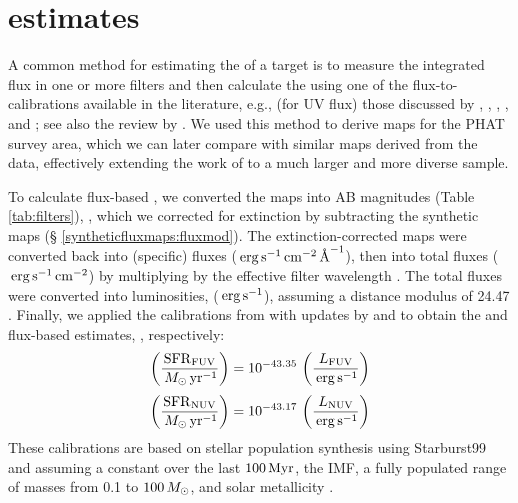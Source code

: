 \documentclass[iop, tighten]{emulateapj}
\begin{document}
\section{\sfr{} estimates}\label{sfrestimates}

\figsfrmapsone

\figsfrmapstwo

A common method for estimating the \sfr{} of a target is to measure the
integrated flux in one or more filters and then calculate the \sfr{} using one
of the flux-to-\sfr{} calibrations available in the literature, e.g., (for UV
flux) those discussed by \citet{Kennicutt:1998}, \citet{Salim:2007},
\citet{Hao:2011}, \citet{Murphy:2011}, and \citet{Leroy:2012}; see also the
review by \citet{Kennicutt:2012}. We used this method to derive \sfr{} maps for
the PHAT survey area, which we can later compare with similar maps derived from
the \citet{Lewis:2014} \sfh{} data, effectively extending the work of
\citet{Simones:2014} to a much larger and more diverse sample.

To calculate flux-based , we converted the \fxobs{} maps into AB
magnitudes (Table \ref{tab:filters}), \xobs{}, which we corrected for
extinction by subtracting the synthetic \ax{} maps (\S
\ref{syntheticfluxmaps:fluxmod}). The extinction-corrected maps were converted
back into (specific) fluxes ($\,\mathrm{erg} \,\mathrm{s}^{-1} \,\mathrm{cm}^{-2} \,\textrm{\AA}^{-1}$), then into
total fluxes ($\,\mathrm{erg} \,\mathrm{s}^{-1} \,\mathrm{cm}^{-2}$) by multiplying by the effective
filter wavelength \citep[$1538.6\ang$ for \fuv{}, $2315.7\ang$ for
\nuv{};][]{Morrissey:2007}. The total fluxes were converted into luminosities,
\lx{} ($\,\mathrm{erg} \,\mathrm{s}^{-1}$), assuming a distance modulus of 24.47
\citep{McConnachie:2005}. Finally, we applied the calibrations from
\citet{Kennicutt:1998} with updates by \citet{Hao:2011} and \citet{Murphy:2011}
\citep[see the review by][]{Kennicutt:2012} to obtain the \fuv{} and \nuv{}
flux-based \sfr{} estimates, \sfrx{}, respectively:
%
\begin{equation}
\left(\frac{\sfrfuv}{\msun\yr^{-1}}\right) =
    10^{-43.35}\,\left(\frac{\lfuv}{\erg\ssec^{-1}}\right)
\label{eq:fuvcal}
\end{equation}
%
\begin{equation}
\left(\frac{\sfrnuv}{\msun\yr^{-1}}\right) =
    10^{-43.17}\,\left(\frac{\lnuv}{\erg\ssec^{-1}}\right)
\label{eq:nuvcal}
\end{equation}
%
These calibrations are based on stellar population synthesis using Starburst99
\citep{Leitherer:1999} and assuming a constant \sfr{} over the last $100\,\mathrm{Myr}$,
the \citet{Kroupa:2001} IMF, a fully populated range of masses from 0.1 to
$100\,M_\odot$, and solar metallicity \citep{Hao:2011}.
\end{document}
